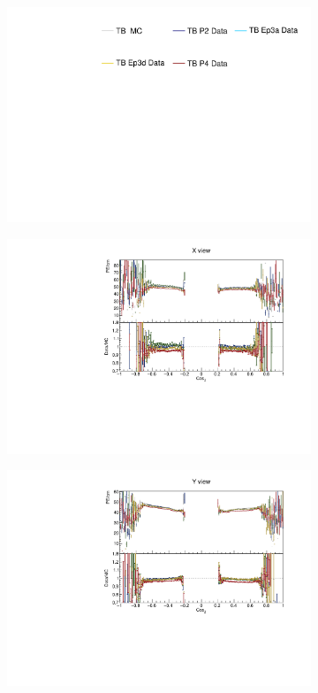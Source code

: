\begin{figure}[!ht]
  \begin{subfigure}{\textwidth}
  \centering
    \includegraphics[height=0.2\linewidth]{essentialsec_tb/legend.pdf}
  \end{subfigure}
  \vspace*{2mm}
  
  \begin{subfigure}{0.495\textwidth}
    \includegraphics[width=\linewidth]{PlotsAngularDistribution/pecm_cosz_x.pdf}
  \end{subfigure}
  \begin{subfigure}{0.495\textwidth}
    \includegraphics[width=\linewidth]{PlotsAngularDistribution/pecm_cosz_y.pdf}

\end{subfigure}
\end{figure}

